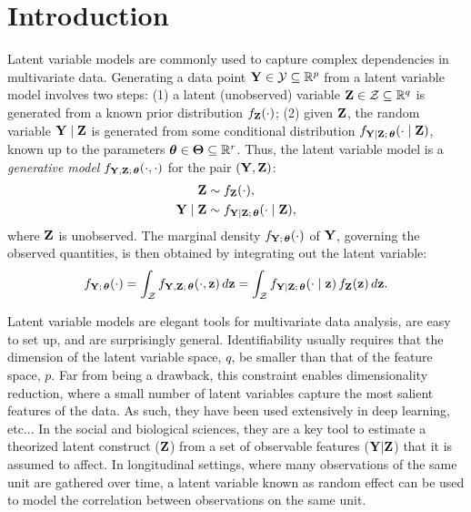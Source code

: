 \documentclass[twoside,11pt]{article}
\begin{document}
\section{Introduction}
Latent variable models are commonly used to capture complex dependencies in multivariate data. 
Generating a data point ${\bf Y} \in \mathcal Y \subseteq \mathbb R^p$ from a latent variable model involves two steps: 
(1) a latent (unobserved) variable ${\bf Z} \in \mathcal Z \subseteq \mathbb R^q$ is generated from a known prior distribution $f_{\bf Z}(\cdot)$; 
(2) given ${\bf Z}$, the random variable ${\bf Y} \mid {\bf Z}$ is generated from some conditional distribution $f_{{\bf Y} \mid {\bf Z};\,{\bm{\theta}}}(\cdot \mid {\bf Z})$, known up to the parameters ${\bm{\theta}} \in \bm\Theta \subseteq \mathbb R^r$. 
Thus, the latent variable model is a \textit{generative model} $f_{{\bf Y}, {\bf Z};\,{\bm{\theta}}}(\cdot, \cdot)$ for the pair $({\bf Y}, {\bf Z})$:
%
\begin{align}
    {\bf Z} &\sim f_{\bf Z}(\cdot), \\
    {\bf Y} \mid {\bf Z} &\sim f_{{\bf Y} \mid {\bf Z};\,{\bm{\theta}}}(\cdot \mid {\bf Z}),
    \label{eqn:generative-model-general}
\end{align}
%
where ${\bf Z}$ is unobserved.
%
The marginal density $f_{{\bf Y};\,{\bm{\theta}}}(\cdot)$ of ${\bf Y}$, governing the observed quantities, is then obtained by integrating out the latent variable:
%
\begin{equation}
    f_{{\bf Y};\,{\bm{\theta}}}(\cdot) 
    = \int_{\mathcal Z} f_{{\bf Y}, {\bf Z};\,{\bm{\theta}}}(\cdot, {\bf z})\, d{\bf z} 
    = \int_{\mathcal Z} f_{{\bf Y} \mid {\bf Z};\,{\bm{\theta}}}(\cdot \mid {\bf z})\, f_{\bf Z}({\bf z})\, d{\bf z}.
\end{equation}

Latent variable models are elegant tools for multivariate data analysis, are easy to set up, and are surprisingly general. Identifiability usually requires that the dimension of the latent variable space, $q$, be smaller than that of the feature space, $p$. Far from being a drawback, this constraint enables dimensionality reduction, where a small number of latent variables capture the most salient features of the data. As such, they have been used extensively in deep learning, etc... In the social and biological sciences, they are a key tool to estimate a theorized latent construct (${\bf Z}$) from a set of observable features (${\bf Y}|{\bf Z}$) that it is assumed to affect. In longitudinal settings, where many observations of the same unit are gathered over time, a latent variable known as random effect can be used to model the correlation between observations on the same unit.
\end{document}
